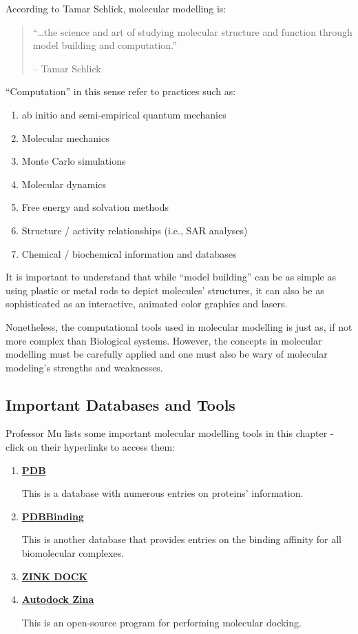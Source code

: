 \documentclass[
  letterpaper,
  DIV=11,
  numbers=noendperiod]{scrreprt}
\providecommand{\tightlist}{%
  \setlength{\itemsep}{0pt}\setlength{\parskip}{0pt}}\usepackage{longtable,booktabs,array}
\begin{document}
According to Tamar Schlick, molecular modelling is:

\begin{quote}
``\ldots the science and art of studying molecular structure and
function through model building and computation.''

-- Tamar Schlick
\end{quote}

``Computation'' in this sense refer to practices such as:

\begin{enumerate}
\def\labelenumi{\arabic{enumi}.}
\tightlist
\item
  ab initio and semi-empirical quantum mechanics
\item
  Molecular mechanics
\item
  Monte Carlo simulations
\item
  Molecular dynamics
\item
  Free energy and solvation methods
\item
  Structure / activity relationships (i.e., SAR analyses)
\item
  Chemical / biochemical information and databases
\end{enumerate}

It is important to understand that while ``model building'' can be as
simple as using plastic or metal rods to depict molecules' structures,
it can also be as sophisticated as an interactive, animated color
graphics and lasers.

Nonetheless, the computational tools used in molecular modelling is just
as, if not more complex than Biological systems. However, the concepts
in molecular modelling must be carefully applied and one must also be
wary of molecular modeling's strengths and weaknesses.

\hypertarget{important-databases-and-tools}{%
\subsection{Important Databases and
Tools}\label{important-databases-and-tools}}

Professor Mu lists some important molecular modelling tools in this
chapter - click on their hyperlinks to access them:

\begin{enumerate}
\def\labelenumi{\arabic{enumi}.}
\item
  \href{https://www.rcsb.org/}{\textbf{PDB}}

  This is a database with numerous entries on proteins' information.
\item
  \href{http://pdbbind.org.cn/}{\textbf{PDBBinding}}

  This is another database that provides entries on the binding affinity
  for all biomolecular complexes.
\item
  \href{}{\textbf{ZINK DOCK}}
\item
  \href{https://vina.scripps.edu/}{\textbf{Autodock Zina}}

  This is an open-source program for performing molecular docking.
\end{enumerate}
\end{document}

